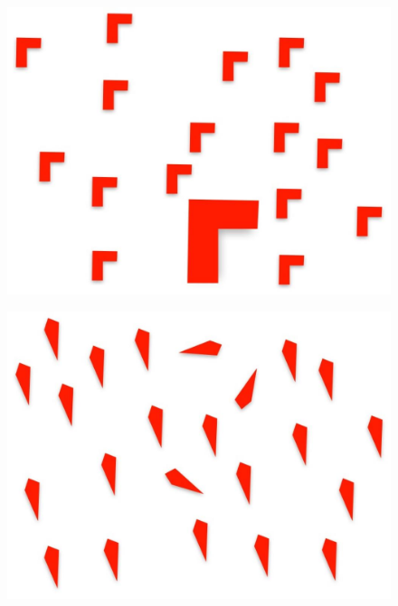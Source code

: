 \documentclass[10pt]{beamer}
\begin{document}
\begin{frame}{}
    \begin{figure}
        \centering
        \includegraphics[width=0.8\linewidth]{./img/syntheticData1.jpg}
    \end{figure}
\end{frame}

\begin{frame}{}
    \begin{figure}
        \centering
        \includegraphics[width=0.8\linewidth]{./img/syntheticData3.jpg}
    \end{figure}
\end{frame}
\end{document}
